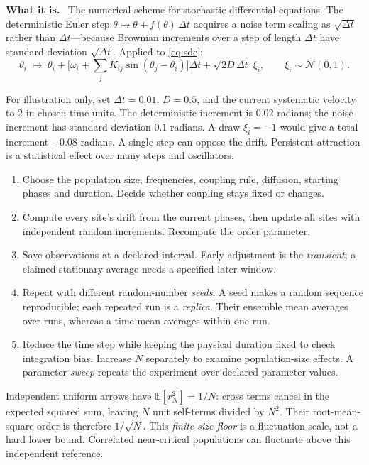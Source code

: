 \documentclass[11pt]{article}
\newcommand{\what}{\par\smallskip\noindent\textbf{What it is.}\ }
\newcommand{\E}{\mathbb{E}}
\begin{document}
\what
The numerical scheme for stochastic differential equations. The deterministic
Euler step $\theta \mapsto \theta + f(\theta)\,\Delta t$ acquires a noise term
scaling as $\sqrt{\Delta t}$ rather than $\Delta t$---because Brownian
increments over a step of length $\Delta t$ have standard deviation
$\sqrt{\Delta t}$. Applied to \eqref{eq:sde}:
\[
 \theta_i \;\mapsto\; \theta_i + \Big[\omega_i+\sum_j K_{ij}\sin(\theta_j-\theta_i)\Big]\Delta t
 + \sqrt{2D\,\Delta t}\;\xi_i ,\qquad \xi_i\sim\mathcal N(0,1).
\]

For illustration only, set $\Delta t=0.01$, $D=0.5$, and the current
systematic velocity to $2$ in chosen time units. The deterministic increment
is $0.02$ radians; the noise increment has standard deviation $0.1$ radians.
A draw $\xi_i=-1$ would give a total increment $-0.08$ radians. A single step
can oppose the drift. Persistent attraction is a statistical effect over
many steps and oscillators.

\begin{enumerate}[leftmargin=*]
\item Choose the population size, frequencies, coupling rule, diffusion,
starting phases and duration. Decide whether coupling stays fixed or changes.
\item Compute every site's drift from the current phases, then update all
sites with independent random increments. Recompute the order parameter.
\item Save observations at a declared interval. Early adjustment is the
\emph{transient}; a claimed stationary average needs a specified later window.
\item Repeat with different random-number \emph{seeds}. A seed makes a random
sequence reproducible; each repeated run is a \emph{replica}. Their ensemble
mean averages over runs, whereas a time mean averages within one run.
\item Reduce the time step while keeping the physical duration fixed to check
integration bias. Increase $N$ separately to examine population-size effects.
A parameter \emph{sweep} repeats the experiment over declared parameter values.
\end{enumerate}

Independent uniform arrows have $\E[r_N^2]=1/N$: cross terms cancel in the
expected squared sum, leaving $N$ unit self-terms divided by $N^2$. Their
root-mean-square order is therefore $1/\sqrt N$. This \emph{finite-size floor}
is a fluctuation scale, not a hard lower bound. Correlated near-critical
populations can fluctuate above this independent reference.
\end{document}
